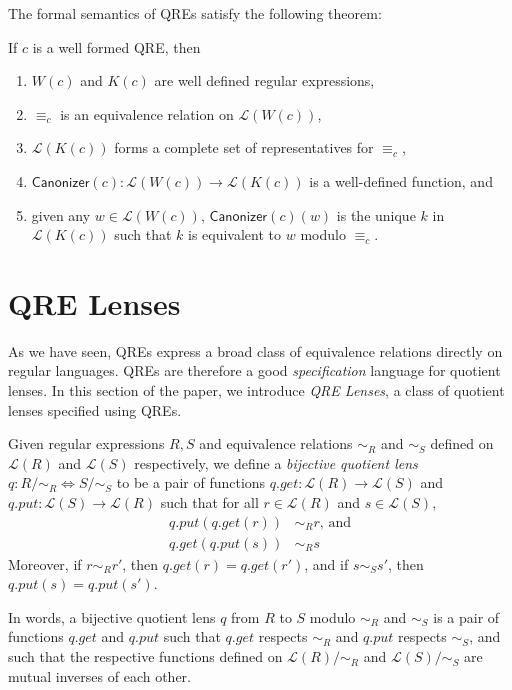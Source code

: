 \documentclass[acmsmall,review,anonymous]{acmart}
\newcommand{\kw}[1]{\ensuremath{\mathsf{#1}}}
\newcommand{\canonizer}{\ensuremath{\kw{Canonizer}}}
\newcommand{\eqrel}[1]{\ensuremath{\equiv_{#1}}}
\begin{document}
The formal semantics of QREs satisfy the following theorem:
\begin{theorem}
If $c$ is a well formed QRE, then
\begin{enumerate}
  \item $W(c)$ and $K(c)$ are well defined regular expressions,
  \item  $\eqrel{c}$ is an equivalence relation on $\mathcal{L}(W(c))$,
  \item  $\mathcal{L}(K(c))$ forms a complete set of representatives for
  $\eqrel{c}$,
  \item $\canonizer(c):\mathcal{L}(W(c)) \longrightarrow \mathcal{L}(K(c))$ is
  a well-defined function, and
  \item  given any $w \in \mathcal{L}(W(c))$, $\canonizer(c)(w)$ is the unique
  $k$ in $\mathcal{L}(K(c))$ such that $k$ is equivalent to $w$ modulo
  $\eqrel{c}$.
\end{enumerate}
\end{theorem}

\section{QRE Lenses}
\label{QRE-lenses}
As we have seen, QREs express a broad class of equivalence relations
directly on regular languages.  QREs are therefore a good \textit{specification}
language for quotient lenses. In this section of the paper, we introduce
\textit{QRE Lenses}, a class of quotient lenses specified using QREs.

Given regular expressions $R, S$ and equivalence relations
$\sim_R$ and $\sim_S$ defined on $\mathcal{L}(R)$ and $\mathcal{L}(S)$
respectively, we define a {\em bijective quotient lens} $q : R /{\sim_R}
\Leftrightarrow S/{\sim_S}$ to be a pair of functions $q.get :
\mathcal{L}(R) \longrightarrow \mathcal{L}(S)$ and $q.put : \mathcal{L}(S)
\longrightarrow \mathcal{L}(R)$ such that for all $r \in \mathcal{L}(R)$ and $s
\in \mathcal{L}(S)$,
\begin{align*}
q.put(q.get(r)) &\sim_R r \text{, and}\\
q.get(q.put(s)) &\sim_R s
\end{align*}
Moreover, if $r \sim_R r'$, then $q.get(r) = q.get(r')$, and if $s \sim_S s'$,
then $q.put(s) = q.put(s')$.

In words, a bijective quotient lens $q$ from $R$ to $S$ modulo $\sim_R$
and $\sim_S$ is a pair of functions $q.get$ and $q.put$ such that $q.get$
respects $\sim_R$ and $q.put$ respects $\sim_S$, and such that the respective
functions defined on $\mathcal{L}(R)/{\sim_R}$ and $\mathcal{L}(S)/{\sim_S}$ are
mutual inverses of each other.
\end{document}
